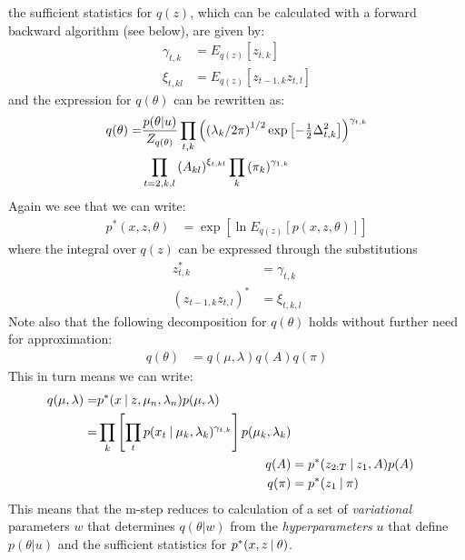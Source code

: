 the sufficient statistics for $q(z)$, which can be calculated with a forward backward algorithm (see below), are given by:
\begin{align}
 \gamma_{t,k} &= E_{q(z)} [z_{t,k}] \\
 \xi_{t,kl} &= E_{q(z)} [z_{t-1,k} z_{t,l}]
\end{align}
and the expression for $q(\theta)$ can be rewritten as:
\begin{align}
  \label{eq:q_theta}
  \begin{split}
    q(\theta)
    =& 
    \frac{p(\theta | u)}{Z_{q(\theta)}} 
    \prod_{t,k}
    \left(
      \left( 
      \lambda_{k} / 2\pi \right)^{1/2}
      \exp 
      \left[
          - \tfrac{1}{2} \Delta_{t,k}^2
      \right]
    \right)^{\gamma_{t,k}}\\
    &
    \prod_{t=2,k,l}
    \left(
      A_{kl}
    \right)^{\xi_{t,kl}} 
    \prod_{k}
    \left(
      \pi_k
    \right)^{\gamma_{1,k}}
  \end{split}
\end{align}
Again we see that we can write:
\begin{align}
  p^*(x, z, \theta) &= \exp \left[ \ln E_{q(z)}[p(x, z, \theta)] \right]
\end{align}
where the integral over $q(z)$ can be expressed through the substitutions
\begin{align*}
 z^*_{t,k} &= \gamma_{t,k} \\ 
 (z_{t-1,k} z_{t,l})^* &= \xi_{t,k,l}
\end{align*}
Note also that the following decomposition for $q(\theta)$ holds without further need for approximation:
\begin{align}
  q(\theta) 
  &= q(\mu, \lambda) q(A) q(\pi)
\end{align}
This in turn means we can write:
\begin{align}
  \begin{split}
    \label{eq:q_mu_l}
    q(\mu, \lambda) 
    =& p^*(x \:|\: z, \mu_{n}, \lambda_{n}) p(\mu, \lambda) \\
    =& \prod_k \left[\prod_t p(x_{t} \:|\: \mu_{k}, \lambda_{k})^{\gamma_{t,k}} \right] 
        p(\mu_{k}, \lambda_{k}) 
  \end{split}\\
  \label{eq:q_A}
  q(A) &= p^*(z_{2:T} \:|\: z_{1}, A) p(A) \\
  \label{eq:q_pi}
  q(\pi) &= p^*(z_{1} \:|\: \pi)
\end{align}
This means that the m-step reduces to calculation of a set of \emph{variational} parameters $w$ that determines $q(\theta | w)$ from the \emph{hyperparameters} $u$ that define $p(\theta|u)$ and the sufficient statistics for $p^*(x,z \:|\: \theta)$.


